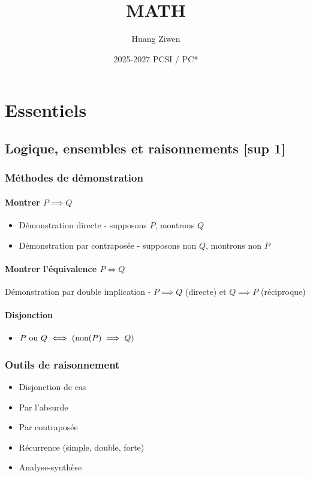 \documentclass[openany]{book}
\title{MATH}
\author{Huang Ziwen}
\date{2025-2027 PCSI / PC*}
\begin{document}
\pagestyle{plain}

\maketitle

\tableofcontents

\clearpage
\chapter{Essentiels}
\section{Logique, ensembles et raisonnements [sup 1]}
\subsection{Méthodes de démonstration}
\subsubsection{Montrer $P \implies Q$}

\begin{itemize}
    \item Démonstration directe - supposons $P$, montrons $Q$
    \item Démonstration par contraposée - supposons non $Q$, montrons non $P$
\end{itemize}

\subsubsection{Montrer l'équivalence $ P \iff Q $}
Démonstration par double implication - $ P \implies Q $ (directe) et $ Q \implies P $ (réciproque)

\subsubsection{Disjonction}
\begin{itemize}
    \item $ P \text{ ou } Q \iff ( \text{non}( P ) \implies Q )$
\end{itemize}

\subsection{Outils de raisonnement}
\begin{itemize}
    \item Disjonction de cas
    \item Par l'absurde
    \item Par contraposée
    \item Récurrence (simple, double, forte)
    \item Analyse-synthèse
\end{itemize}
\end{document}
